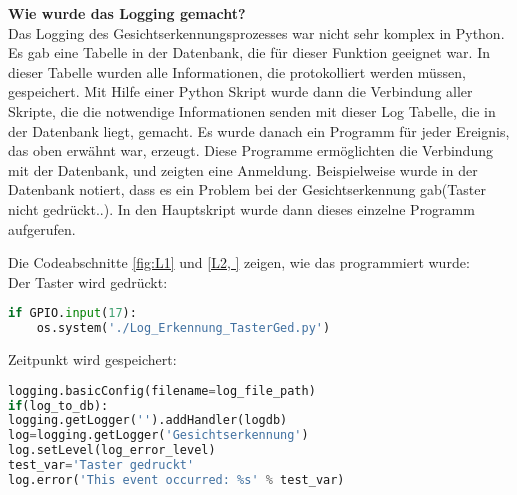 \textbf{Wie wurde das Logging gemacht?}\\
Das Logging des Gesichtserkennungsprozesses war nicht sehr komplex in Python. Es gab eine Tabelle in der Datenbank, die für dieser Funktion geeignet war. In dieser Tabelle wurden alle Informationen, die protokolliert werden müssen, gespeichert. Mit Hilfe einer Python Skript wurde dann die Verbindung aller Skripte, die die notwendige Informationen senden mit dieser Log Tabelle, die in der Datenbank liegt, gemacht. Es wurde danach ein Programm für jeder Ereignis, das oben erwähnt war, erzeugt. Diese Programme ermöglichten die Verbindung mit der Datenbank, und zeigten eine Anmeldung. Beispielweise wurde in der Datenbank notiert, dass es ein Problem bei der Gesichtserkennung gab(Taster nicht gedrückt..). In den Hauptskript wurde dann dieses einzelne Programm aufgerufen.

Die Codeabschnitte \ref{fig:L1} und \ref{L2, } zeigen, wie das programmiert wurde:\\

Der Taster wird gedrückt: \\

\begin{lstlisting}[caption={Log f{\"u}r gedr{\"u}cktes Taster},label={fig:L1},language=Python]
	if GPIO.input(17):
	os.system('./Log_Erkennung_TasterGed.py')
\end{lstlisting}

Zeitpunkt wird gespeichert: \\

\begin{lstlisting}[caption={Log f{\"u}r den Zeitpunkt},label={fig:L2},language=Python]
logging.basicConfig(filename=log_file_path)
if(log_to_db):
logging.getLogger('').addHandler(logdb)
log=logging.getLogger('Gesichtserkennung')
log.setLevel(log_error_level)
test_var='Taster gedruckt'
log.error('This event occurred: %s' % test_var)
\end{lstlisting}

